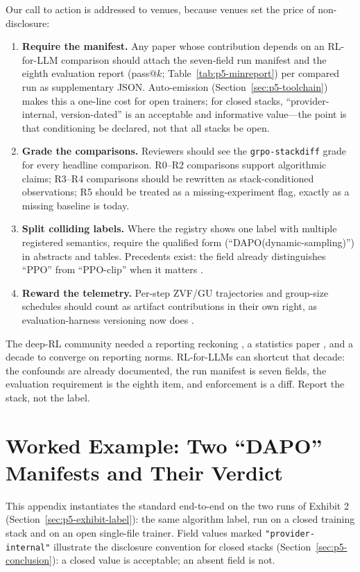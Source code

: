 \documentclass{article}  \usepackage[preprint,nonatbib]{neurips_2026} \usepackage[numbers]{natbib}
\providecommand{\tableref}[1]{Table~\ref{#1}}
\providecommand{\secref}[1]{Section~\ref{#1}}
\begin{document}
Our call to action is addressed to venues, because venues set the price of
non-disclosure:
\begin{enumerate}[leftmargin=1.5em, itemsep=2pt, topsep=2pt]
\item \textbf{Require the manifest.} Any paper whose contribution depends on
an RL-for-LLM comparison should attach the seven-field run manifest and the
eighth evaluation report (pass@$k$; \tableref{tab:p5-minreport}) per compared
run as supplementary JSON.
Auto-emission (\secref{sec:p5-toolchain}) makes this a one-line cost for
open trainers; for closed stacks, ``provider-internal, version-dated'' is an
acceptable and informative value---the point is that conditioning be
declared, not that all stacks be open.
\item \textbf{Grade the comparisons.} Reviewers should see the
\texttt{grpo-stackdiff} grade for every headline comparison. R0--R2
comparisons support algorithmic claims; R3--R4 comparisons should be
rewritten as stack-conditioned observations; R5 should be treated as a
missing-experiment flag, exactly as a missing baseline is today.
\item \textbf{Split colliding labels.} Where the registry shows one label
with multiple registered semantics, require the qualified form
(``DAPO(dynamic-sampling)'') in abstracts and tables. Precedents exist: the
field already distinguishes ``PPO'' from ``PPO-clip'' when it matters
\citep{schulman2017proximal, henderson2018deep}.
\item \textbf{Reward the telemetry.} Per-step ZVF/GU trajectories and
group-size schedules should count as artifact contributions in their own
right, as evaluation-harness versioning now does
\citep{biderman2024lessons, pineau2020improving}.
\end{enumerate}
The deep-RL community needed a reporting reckoning \citep{henderson2018deep}, a
statistics paper \citep{colas2019hitchhiker, agarwal2021deep}, and a decade
to converge on reporting norms. RL-for-LLMs can shortcut that decade: the
confounds are already documented, the run manifest is seven fields, the
evaluation requirement is the eighth item, and enforcement is a diff. Report
the stack, not the label.
 \appendix
\section{Worked Example: Two ``DAPO'' Manifests and Their Verdict}
\label{app:p5-worked}
This appendix instantiates the standard end-to-end on the two runs of
Exhibit 2 (\secref{sec:p5-exhibit-label}): the same algorithm label, run on a
closed training stack and on an open single-file trainer. Field values marked
\texttt{"provider-internal"} illustrate the disclosure convention for closed
stacks (\secref{sec:p5-conclusion}): a closed value is acceptable; an absent
field is not.
\end{document}
